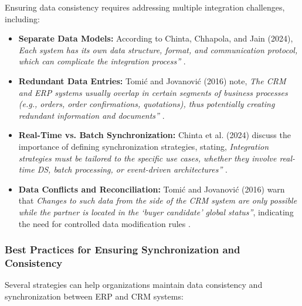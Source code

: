 Ensuring data consistency requires addressing multiple integration challenges, including:
\begin{itemize}
\item \textbf{Separate Data Models:} According to Chinta, Chhapola, and Jain (2024), \textit{Each system has its own data structure, format, and communication protocol, which can complicate the integration process''} \cite{chinta2024}.
    \item \textbf{Redundant Data Entries:} Tomić and Jovanović (2016) note, \textit{The CRM and ERP systems usually overlap in certain segments of business processes (e.g., orders, order confirmations, quotations), thus potentially creating redundant information and documents''} \cite{tomic2016}.
\item \textbf{Real-Time vs. Batch Synchronization:} Chinta et al. (2024) discuss the importance of defining synchronization strategies, stating, \textit{Integration strategies must be tailored to the specific use cases, whether they involve real-time DS, batch processing, or event-driven architectures''} \cite{chinta2024}.
    \item \textbf{Data Conflicts and Reconciliation:} Tomić and Jovanović (2016) warn that \textit{Changes to such data from the side of the CRM system are only possible while the partner is located in the ‘buyer candidate’ global status''}, indicating the need for controlled data modification rules \cite{tomic2016}.
\end{itemize}

\subsubsection{Best Practices for Ensuring Synchronization and Consistency}

Several strategies can help organizations maintain data consistency and synchronization between ERP and CRM systems:

